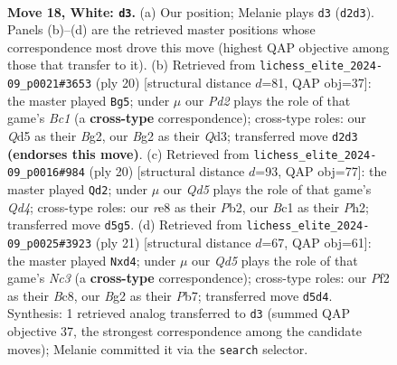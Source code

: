 \documentclass[11pt]{article}
\begin{document}
\clearpage

\begin{figure}[p]\centering
\begin{subfigure}{0.46\textwidth}\centering
\resizebox{\linewidth}{!}{%
\newchessgame
\chessboard[
  setfen={r1bqr2k/1p1pppbp/p2n4/3Q4/2P5/2N2N2/PP1P1PBP/R1B2RK1 w - - 0 18},
  showmover=false,
  pgfstyle=straightmove, color=movearrow, markmove={d2-d3}
]}
\caption{}
\end{subfigure}\hfill
\begin{subfigure}{0.46\textwidth}\centering
\resizebox{\linewidth}{!}{%
\newchessgame
\chessboard[
  setfen={r1bq1rk1/pp3ppp/2n2n2/3p4/1b1N4/2NQ2P1/PP2PPBP/R1B2RK1 w - - 1 11},
  showmover=false,
  pgfstyle=straightmove, color=movearrow, markmove={c1-g5}
]}
\caption{}
\end{subfigure}
\\[4pt]
\begin{subfigure}{0.46\textwidth}\centering
\resizebox{\linewidth}{!}{%
\newchessgame
\chessboard[
  setfen={r1bq1rk1/pp2ppb1/3p1np1/7p/3QP3/2N1BP2/PPP3PP/2KR1B1R w - - 3 11},
  showmover=false,
  pgfstyle=straightmove, color=movearrow, markmove={d4-d2}
]}
\caption{}
\end{subfigure}\hfill
\begin{subfigure}{0.46\textwidth}\centering
\resizebox{\linewidth}{!}{%
\newchessgame
\chessboard[
  setfen={r1b2rk1/1p2bppp/2n1pn2/p2q4/2NN4/4P3/PP2BPPP/R1BQ1RK1 b - - 3 11},
  showmover=false,
  pgfstyle=straightmove, color=movearrow, markmove={c6-d4}
]}
\caption{}
\end{subfigure}
\caption{\textbf{Move 18, White: \texttt{d3}.} (a) Our position; Melanie plays \texttt{d3} (\texttt{d2d3}). Panels (b)--(d) are the retrieved master positions whose correspondence most drove this move (highest QAP objective among those that transfer to it). (b) Retrieved from \texttt{lichess\_elite\_2024-09\_p0021\#3653} (ply 20) [structural distance $d$=81, QAP obj=37]: the master played \texttt{Bg5}; under $\mu$ our \emph{Pd2} plays the role of that game's \emph{Bc1} (a \textbf{cross-type} correspondence); cross-type roles: our \emph{Q}d5 as their \emph{B}g2, our \emph{B}g2 as their \emph{Q}d3; transferred move \texttt{d2d3} \textbf{(endorses this move)}. (c) Retrieved from \texttt{lichess\_elite\_2024-09\_p0016\#984} (ply 20) [structural distance $d$=93, QAP obj=77]: the master played \texttt{Qd2}; under $\mu$ our \emph{Qd5} plays the role of that game's \emph{Qd4}; cross-type roles: our \emph{r}e8 as their \emph{P}b2, our \emph{B}c1 as their \emph{P}h2; transferred move \texttt{d5g5}. (d) Retrieved from \texttt{lichess\_elite\_2024-09\_p0025\#3923} (ply 21) [structural distance $d$=67, QAP obj=61]: the master played \texttt{Nxd4}; under $\mu$ our \emph{Qd5} plays the role of that game's \emph{Nc3} (a \textbf{cross-type} correspondence); cross-type roles: our \emph{P}f2 as their \emph{B}c8, our \emph{B}g2 as their \emph{P}b7; transferred move \texttt{d5d4}. Synthesis: 1 retrieved analog transferred to \texttt{d3} (summed QAP objective 37, the strongest correspondence among the candidate moves); Melanie committed it via the \texttt{search} selector.}
\label{fig:thought-m34}
\end{figure}
\end{document}
